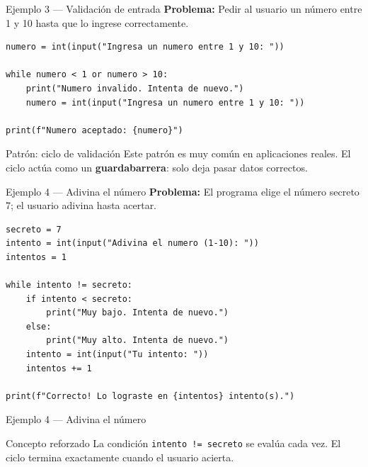 \documentclass[aspectratio=169,xcolor=dvipsnames]{beamer}
\begin{document}
\begin{frame}[fragile]{Ejemplo 3 --- Validaci\'on de entrada}
    \textbf{Problema:} Pedir al usuario un n\'umero entre 1 y 10 hasta que lo ingrese correctamente.

\begin{lstlisting}[style=PythonStyle]
numero = int(input("Ingresa un numero entre 1 y 10: "))

while numero < 1 or numero > 10:
    print("Numero invalido. Intenta de nuevo.")
    numero = int(input("Ingresa un numero entre 1 y 10: "))

print(f"Numero aceptado: {numero}")
\end{lstlisting}

    \vspace{0.2cm}
    \begin{block}{Patr\'on: ciclo de validaci\'on}
        Este patr\'on es muy com\'un en aplicaciones reales. El ciclo act\'ua como
        un \textbf{guardabarrera}: solo deja pasar datos correctos.
    \end{block}
\end{frame}

\begin{frame}[fragile]{Ejemplo 4 --- Adivina el n\'umero}
    \textbf{Problema:} El programa elige el n\'umero secreto 7; el usuario adivina hasta acertar.

\begin{lstlisting}[style=PythonStyle]
secreto = 7
intento = int(input("Adivina el numero (1-10): "))
intentos = 1

while intento != secreto:
    if intento < secreto:
        print("Muy bajo. Intenta de nuevo.")
    else:
        print("Muy alto. Intenta de nuevo.")
    intento = int(input("Tu intento: "))
    intentos += 1

print(f"Correcto! Lo lograste en {intentos} intento(s).")
\end{lstlisting}
\end{frame}
\begin{frame}[fragile]{Ejemplo 4 --- Adivina el n\'umero}

    \begin{exampleblock}{Concepto reforzado}
        La condici\'on \texttt{intento != secreto} se eval\'ua cada vez.
        El ciclo termina exactamente cuando el usuario acierta.
    \end{exampleblock}
\end{frame}

\end{document}
